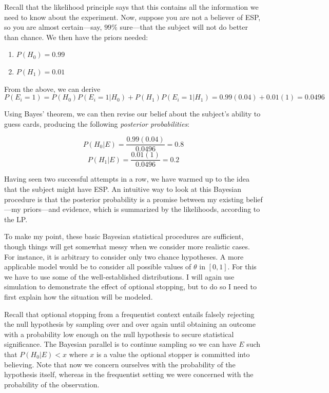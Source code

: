 Recall that the likelihood principle says that this contains all the
information we need to know about the experiment. Now, suppose you are
not a believer of ESP, so you are almost certain---say, \(99\%\)
sure---that the subject will not do better than chance. We then have the
priors needed:

\begin{enumerate}
\def\labelenumi{\arabic{enumi}.}
\setcounter{enumi}{4}
\tightlist
\item
  \(P(H_0) = 0.99\)
\item
  \(P(H_1) = 0.01\)
\end{enumerate}

From the above, we can derive
\[P(E_i = 1) = P(H_0)P(E_i=1|H_0) + P(H_1)P(E_i=1|H_1) = 0.99(0.04)+0.01(1) = 0.0496\]

Using Bayes' theorem, we can then revise our belief about the subject's
ability to guess cards, producing the following \emph{posterior
probabilities}:

\[P(H_0|E) = \frac{0.99(0.04)}{0.0496} = 0.8\]
\[P(H_1|E) = \frac{0.01(1)}{0.0496} = 0.2\]

Having seen two successful attempts in a row, we have warmed up to the
idea that the subject might have ESP. An intuitive way to look at this
Bayesian procedure is that the posterior probability is a promise
between my existing belief---my priors---and evidence, which is
summarized by the likelihoods, according to the LP.

To make my point, these basic Bayesian statistical procedures are
sufficient, though things will get somewhat messy when we consider more
realistic cases. For instance, it is arbitrary to consider only two
chance hypotheses. A more applicable model would be to consider all
possible values of \(\theta\) in \([0,1]\). For this we have to use some
of the well-established distributions. I will again use simulation
to demonstrate the effect of optional stopping, but to do so I need to first explain
how the situation will be modeled.

Recall that optional stopping from a frequentist context entails
falsely rejecting the null hypothesis by sampling over and over again until
obtaining an outcome with a probability low enough on the null
hypothesis to secure statistical significance. The Bayesian parallel is
to continue sampling so we can have \(E\) such that \(P(H_0|E) < x\)
where \(x\) is a value the optional stopper is committed into believing.
Note that now we concern ourselves with the probability of the hypothesis
itself, whereas in the frequentist setting we were concerned with the
probability of the observation.

